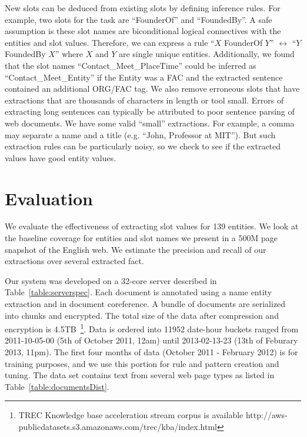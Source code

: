 \documentclass[letterpaper]{article}
\begin{document}
New slots can be deduced from existing slots by defining inference rules.
For example, two slots for the task are ``FounderOf'' and ``FoundedBy''.
A safe assumption is these slot names are biconditional logical connectives with the entities and slot values.
Therefore, we can express a rule ``$X$ FounderOf $Y$'' $\leftrightarrow$ ``$Y$ FoundedBy $X$'' where $X$ and $Y$ are single unique entities.
Additionally, we found that the slot names ``Contact\_Meet\_PlaceTime'' could be inferred as ``Contact\_Meet\_Entity'' if the Entity was a FAC and the extracted sentence contained an additional ORG/FAC tag.
We also remove erroneous slots that have extractions that are thousands of characters in length or tool small.
Errors of extracting long sentences can typically be attributed to poor sentence parsing of web documents.
We have some valid ``small'' extractions. For example, a comma may separate a name and a title (e.g. ``John, Professor at MIT'').
But such extraction rules can be particularly noisy, so we check to see if the extracted values have good entity values.


\section{Evaluation}
\label{sec:results}

We evaluate the effectiveness of extracting slot values for 139 entities.
We look at the baseline coverage for entities and slot names we present in a 500M page snapshot of the English web.
We estimate the precision and recall of our extractions over several extracted fact. 


Our system was developed on a 32-core server described in Table~\ref{table:serverspec}.
Each document is annotated using a name entity extraction and in document coreference.
A bundle of documents are serialized into chunks and encrypted.
The total size of the data after compression and encryption is 4.5TB~\footnote{TREC Knowledge base acceleration stream corpus is available  http://aws-publicdatasets.s3.amazonaws.com/trec/kba/index.html}.
Data is ordered into 11952 date-hour buckets ranged from 2011-10-05-00 (5th of October 2011, 12am)
until 2013-02-13-23 (13th of Feburary 2013, 11pm).
The first four months of data (October 2011 - February 2012) is for training purposes, 
and we use this portion for rule and pattern creation and tuning.
The data set contains text from several web page types as listed in Table~\ref{table:documentsDist}.
 
\end{document}
